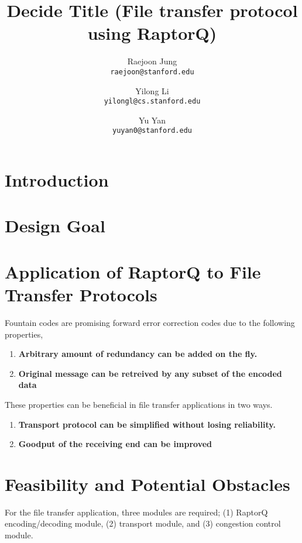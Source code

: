 \documentclass{sig-alternate-10pt}
\begin{document}
\title{Decide Title (File transfer protocol using RaptorQ)}
\author{
  Raejoon Jung\\
  \texttt{raejoon@stanford.edu}
  \and
  Yilong Li\\
  \texttt{yilongl@cs.stanford.edu}
  \and 
  Yu Yan\\
  \texttt{yuyan0@stanford.edu}
}

\maketitle
\section{Introduction}

\section{Design Goal}

\section{Application of RaptorQ to File Transfer Protocols}
Fountain codes are promising forward error correction codes due to the following properties,
\begin{enumerate}
  \item \textbf{Arbitrary amount of redundancy can be added on the fly.}  
  \item \textbf{Original message can be retreived by any subset of the encoded
  data}
\end{enumerate}

These properties can be beneficial in file transfer applications in two ways.
\begin{enumerate}
  \item \textbf{Transport protocol can be simplified without losing
  reliability.}
  \item \textbf{Goodput of the receiving end can be improved}
\end{enumerate}

\section{Feasibility and Potential Obstacles}
For the file transfer application, three modules are required; (1) RaptorQ
encoding/decoding module, (2) transport module, and (3) congestion control
module. 
\end{document}

